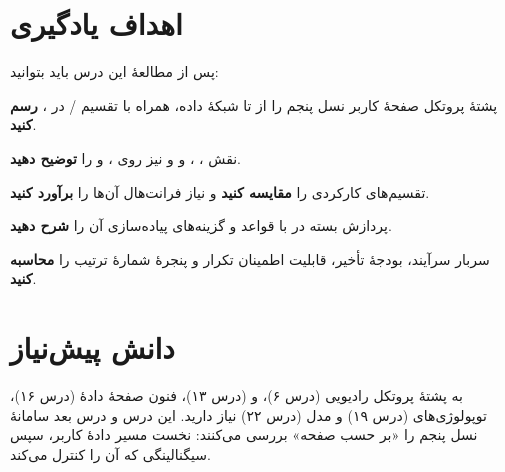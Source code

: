 \documentclass[11pt,a4paper]{article}
\begin{document}
\ACNcover

\section{اهداف یادگیری}
پس از مطالعهٔ این درس باید بتوانید:
\begin{objectives}
  \item پشتهٔ پروتکل صفحهٔ کاربر نسل پنجم را از  تا شبکهٔ داده، همراه با تقسیم / در ، \textbf{رسم کنید}.
  \item نقش ، ،  و  و نیز  روی ،  و  را \textbf{توضیح دهید}.
  \item تقسیم‌های کارکردی  را \textbf{مقایسه کنید} و نیاز فرانت‌هال آن‌ها را \textbf{برآورد کنید}.
  \item پردازش بسته در  با قواعد  و گزینه‌های پیاده‌سازی آن را \textbf{شرح دهید}.
  \item سربار سرآیند، بودجهٔ تأخیر، قابلیت اطمینان تکرار و پنجرهٔ شمارهٔ ترتیب را \textbf{محاسبه کنید}.
\end{objectives}

\section{دانش پیش‌نیاز}
به پشتهٔ پروتکل رادیویی  (درس ۶)،  و  (درس ۱۳)، فنون صفحهٔ دادهٔ  (درس ۱۶)، توپولوژی‌های
 (درس ۱۹) و مدل  (درس ۲۲) نیاز دارید. این درس و درس بعد سامانهٔ نسل پنجم را «بر حسب صفحه» بررسی می‌کنند: نخست مسیر
دادهٔ کاربر، سپس سیگنالینگی که آن را کنترل می‌کند.
\end{document}
